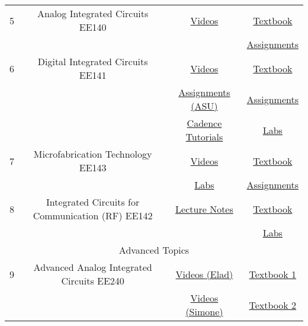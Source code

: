 \documentclass{article}
\begin{document}
\begin{table}[H]
{\begin{tabular}{|c|c|c|c|}
            5& Analog Integrated Circuits EE140& \href{http://www.infocobuild.com/education/audio-video-courses/electronics/ee140-spring2011-berkeley.html}{Videos}& \href{https://drive.google.com/file/d/10jptwIjZyKZucCfCkCYNZDeIluk5ocQV/view?usp=share_link}{Textbook}\\
            & & & \href{https://people.eecs.berkeley.edu/~pister/140sp20/hw/}{Assignments}\\ \hline
            6& Digital Integrated Circuits EE141& \href{https://www.youtube.com/playlist?list=PLpelQYOtPS_GffAjTNVRyy-QW5ydtkYvg}{Videos}& \href{https://drive.google.com/file/d/1-clLoEkncZoUtc61PNqQZfctg7kJ0UlC/view?usp=share_link}{Textbook}\\ 
            & & \href{https://drive.google.com/drive/folders/1weSIhUowqP4sE5Lw5QbcLAbCg0UWZ5wu}{Assignments (ASU)}& \href{http://bwrcs.eecs.berkeley.edu/Classes/icdesign/ee141_f12/assignments.htm}{Assignments}\\
            & & \href{http://www.vlsi.wpi.edu/cds/}{Cadence Tutorials}& \href{http://bwrcs.eecs.berkeley.edu/Classes/icdesign/ee141_f12/labs.html}{Labs}\\ \hline
            7& Microfabrication Technology EE143& \href{http://www.infocobuild.com/education/audio-video-courses/electronics/ee143-fall2014-berkeley.html}{Videos}& \href{http://library.lol/main/96DB8102DE6BC5B399389C81A24B1B28}{Textbook}\\ 
            & & \href{https://www-inst.eecs.berkeley.edu//~ee143/fa10/lab.html}{Labs}& \href{https://www-inst.eecs.berkeley.edu//~ee143/fa10/homework.html}{Assignments}\\ \hline
            8& Integrated Circuits for Communication (RF) EE142& \href{http://rfic.eecs.berkeley.edu/142/lectures.html}{Lecture Notes}& \href{https://picture.iczhiku.com/resource/eetop/WYIGWRuzPsQfJvxM.pdf}{Textbook}\\ 
            & & & \href{http://rfic.eecs.berkeley.edu/142/labs.html}{Labs}\\ \hline
            \multicolumn{4}{|c|}{Advanced Topics}\\ \hline
            9& Advanced Analog Integrated Circuits EE240& \href{https://youtube.com/playlist?list=PLoylzyWSZVlecBdrlBx5zz8-67staJI6X}{Videos (Elad)}& \href{http://fa.ee.sut.ac.ir/Downloads/AcademicStaff/24/Courses/73/[Gray___Meyer]_Analysis_and_Design_of_Analog_Integrated_Circuits_5th_ed.pdf}{Textbook 1}\\ 
            & & \href{http://www.infocobuild.com/education/audio-video-courses/electronics/ee240-spring2011-berkeley.html}{Videos (Simone)}& \href{https://drive.google.com/file/d/10jptwIjZyKZucCfCkCYNZDeIluk5ocQV/view?usp=share_link}{Textbook 2}\\ 

\end{tabular}}
\end{table}
\end{document}
